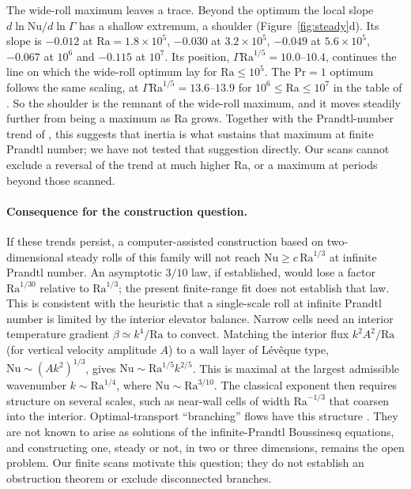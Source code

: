 The wide-roll maximum leaves a trace. Beyond the optimum the local slope $d\ln\mathrm{Nu}/d\ln\Gamma$ has a shallow
extremum, a shoulder (Figure~\ref{fig:steady}d). Its slope is $-0.012$ at $\mathrm{Ra}=1.8\times10^5$,
$-0.030$ at $3.2\times10^5$, $-0.049$ at $5.6\times10^5$, $-0.067$ at $10^6$ and $-0.115$ at $10^7$. Its position,
$\Gamma\mathrm{Ra}^{1/5}=10.0$--$10.4$, continues the line on which the wide-roll optimum lay for
$\mathrm{Ra}\le10^5$. The $\mathrm{Pr}=1$ optimum follows the same scaling, at
$\Gamma\mathrm{Ra}^{1/5}=13.6$--$13.9$ for $10^6\le\mathrm{Ra}\le10^7$ in the table of
\citet{WenGoluskinDoering2022}. So the shoulder is the remnant of the wide-roll maximum, and it moves steadily
further from being a maximum as Ra grows. Together with the Prandtl-number trend of
\citet{SondakSmithWaleffe2015}, this suggests that inertia is what sustains that maximum at finite Prandtl number;
we have not tested that suggestion directly. Our scans cannot exclude a reversal of the trend at much higher Ra,
or a maximum at periods beyond those scanned.

\paragraph{Consequence for the construction question.} If these trends persist, a computer-assisted
construction based on two-dimensional steady rolls of this family will not reach
$\mathrm{Nu}\ge c\,\mathrm{Ra}^{1/3}$ at infinite Prandtl number. An asymptotic $3/10$ law, if established, would lose a factor
$\mathrm{Ra}^{1/30}$ relative to $\mathrm{Ra}^{1/3}$; the present finite-range fit does not establish that law.
This is consistent with the heuristic that a single-scale roll at infinite Prandtl number is limited by the
interior elevator balance. Narrow cells need an interior temperature gradient $\beta\simeq k^4/\mathrm{Ra}$ to
convect. Matching the interior flux $k^2A^2/\mathrm{Ra}$ (for vertical velocity amplitude $A$) to a wall layer of
L\'ev\^eque type, $\mathrm{Nu}\sim(Ak^2)^{1/3}$, gives $\mathrm{Nu}\sim\mathrm{Ra}^{1/5}k^{2/5}$. This is maximal
at the largest admissible wavenumber $k\sim\mathrm{Ra}^{1/4}$, where $\mathrm{Nu}\sim\mathrm{Ra}^{3/10}$. The
classical exponent then requires structure on several scales, such as near-wall cells of width
$\mathrm{Ra}^{-1/3}$ that coarsen into the interior. Optimal-transport ``branching'' flows have this structure
\citep{TobascoDoering2017}. They are not known to arise as solutions of the infinite-Prandtl Boussinesq equations,
and constructing one, steady or not, in two or three dimensions, remains the open problem. Our finite scans motivate this question; they do not establish an obstruction theorem or exclude disconnected branches.

